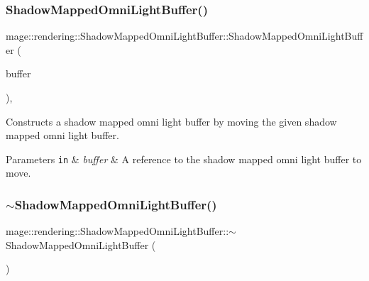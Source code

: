 \subsubsection{\texorpdfstring{Shadow\+Mapped\+Omni\+Light\+Buffer()}{ShadowMappedOmniLightBuffer()}\hspace{0.1cm}{\footnotesize\ttfamily [3/3]}}
{\footnotesize\ttfamily mage\+::rendering\+::\+Shadow\+Mapped\+Omni\+Light\+Buffer\+::\+Shadow\+Mapped\+Omni\+Light\+Buffer (\begin{DoxyParamCaption}\item[{\hyperlink{structmage_1_1rendering_1_1_shadow_mapped_omni_light_buffer}{Shadow\+Mapped\+Omni\+Light\+Buffer} \&\&}]{buffer }\end{DoxyParamCaption})\hspace{0.3cm}{\ttfamily [default]}, {\ttfamily [noexcept]}}

Constructs a shadow mapped omni light buffer by moving the given shadow mapped omni light buffer.


\begin{DoxyParams}[1]{Parameters}
\mbox{\tt in}  & {\em buffer} & A reference to the shadow mapped omni light buffer to move. \\
\hline
\end{DoxyParams}
\hypertarget{structmage_1_1rendering_1_1_shadow_mapped_omni_light_buffer_afd9afa7796bbca38082cc8364f7c474c}{}\label{structmage_1_1rendering_1_1_shadow_mapped_omni_light_buffer_afd9afa7796bbca38082cc8364f7c474c} 
\subsubsection{\texorpdfstring{$\sim$\+Shadow\+Mapped\+Omni\+Light\+Buffer()}{~ShadowMappedOmniLightBuffer()}}
{\footnotesize\ttfamily mage\+::rendering\+::\+Shadow\+Mapped\+Omni\+Light\+Buffer\+::$\sim$\+Shadow\+Mapped\+Omni\+Light\+Buffer (\begin{DoxyParamCaption}{ }\end{DoxyParamCaption})\hspace{0.3cm}{\ttfamily [default]}}

